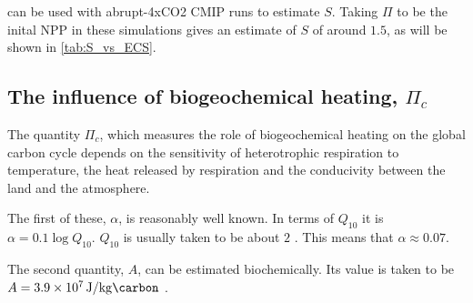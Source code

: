  can be used with abrupt-4xCO2 CMIP runs \parencite{Eyring2016} to estimate $S$. Taking $\Pi$ to be the inital NPP in these simulations gives an estimate of $S$ of around $1.5$,
as will be shown in \cref{tab:S_vs_ECS}.

\subsection{The influence of biogeochemical heating, $\Pi_c$}
The quantity $\Pi_c$, which measures the role of biogeochemical heating on the global carbon cycle depends on the sensitivity of heterotrophic respiration to
temperature, the heat released by respiration and the conducivity between the land and the atmosphere.

The first of these, $\alpha$, is reasonably well known. In terms of $Q_{10}$ it is $\alpha = 0.1 \log Q_{10}$. $Q_{10}$ is usually taken to be about $2$
\parencite{Jones2001,Clark2011}. This means that $\alpha \approx 0.07$.

The second quantity, $A$, can be estimated biochemically. Its value is taken to be $A = \SI{3.9E7}{\joule\per\kilo\gram\carbon}$ \parencite{Luke2011}.

